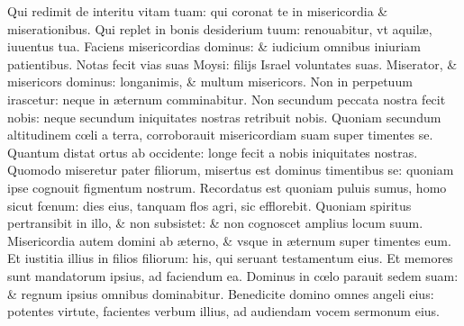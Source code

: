 \documentclass[a5paper,10pt]{book}
\def\ae{æ}
\def\oe{œ}
\begin{document}
\begin{multicols*}{2}
\newline \color{red} Q\color{black}ui redimit de interitu vitam tuam: qui coronat te in misericordia \& miserationibus.
\newline \color{red} Q\color{black}ui replet in bonis desiderium tuum: renouabitur, vt aquil\ae , iuuentus tua.
\newline \color{red} F\color{black}aciens misericordias dominus: \& iudicium omnibus iniuriam patientibus.
\newline \color{red} N\color{black}otas fecit vias suas Moysi: filijs Israel voluntates suas.
\newline \color{red} M\color{black}iserator, \& misericors dominus: longanimis, \& multum misericors.
\newline \color{red} N\color{black}on in perpetuum irascetur: neque in \ae ternum comminabitur.
\newline \color{red} N\color{black}on secundum peccata nostra fecit nobis: neque secundum iniquitates nostras retribuit nobis.
\newline \color{red} Q\color{black}uoniam secundum altitudinem c\oe li a terra, corroborauit misericordiam suam super timentes se.
\newline \color{red} Q\color{black}uantum distat ortus ab occidente: longe fecit a nobis iniquitates nostras.
\newline \color{red} Q\color{black}uomodo miseretur pater filiorum, misertus est dominus timentibus se: quoniam ipse cognouit figmentum nostrum.
\newline \color{red} R\color{black}ecordatus est quoniam puluis sumus, homo sicut f\oe num: dies eius, tanquam flos agri, sic efflorebit.
\newline \color{red} Q\color{black}uoniam spiritus pertransibit in illo, \& non subsistet: \& non cognoscet amplius locum suum.
\newline \color{red} M\color{black}isericordia autem domini ab \ae terno, \& vsque in \ae ternum super timentes eum.
\newline \color{red} E\color{black}t iustitia illius in filios filiorum: his, qui seruant testamentum eius.
\newline \color{red} E\color{black}t memores sunt mandatorum ipsius, ad faciendum ea.
\newline \color{red} D\color{black}ominus in c\oe lo parauit sedem suam: \& regnum ipsius omnibus dominabitur.
\newline \color{red} B\color{black}enedicite domino omnes angeli eius: potentes virtute, facientes verbum illius, ad audiendam vocem sermonum eius.

\end{multicols*}
\end{document}
